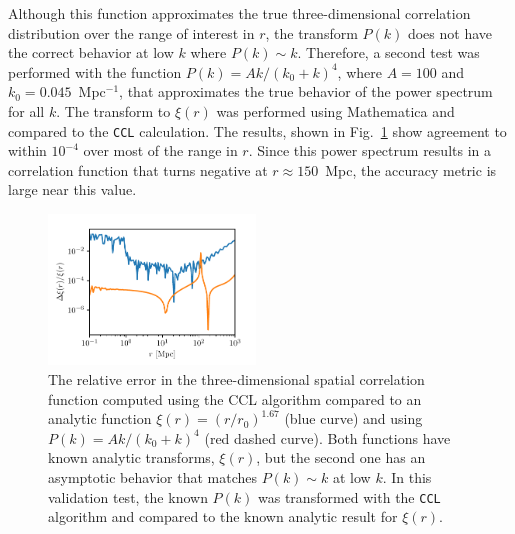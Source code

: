 \documentclass[\docopts]{\docclass}
\newcommand{\ccl}{{\tt CCL}\xspace}
\begin{document}
Although this function approximates the true three-dimensional correlation distribution over the range of interest in $r$, the transform $P(k)$ does not have the correct behavior at low $k$ where $P(k) \sim  k$. Therefore, a second test was performed with the function $P(k) = A k / (k_0 + k)^4$, where $A = 100$ and $k_0 = 0.045$~Mpc$^{-1}$, that approximates the true behavior of the power spectrum for all $k$.
The transform to $\xi(r)$ was performed using Mathematica and compared to the \ccl calculation. The results, shown in Fig.~\ref{fig:analytic_xi} show agreement to within $10^{-4}$ over most of the range in $r$. Since this power spectrum results in a correlation function that turns negative at $r \approx 150$~Mpc, the accuracy metric is large near this value. 

%
\begin{figure}[htbp]
\centering
\includegraphics[width=0.49\textwidth]{3dcorr_analytic}
\caption{The relative error in the three-dimensional spatial correlation function computed using the CCL algorithm compared to an analytic function $\xi(r) = (r/r_0)^{1.67}$ (blue curve) and using $P(k) = A k / (k_0 + k)^4$ (red dashed curve). Both functions have known analytic transforms, $\xi(r)$, but the second one has an asymptotic behavior that matches $P(k)\sim k$ at low $k$. In this validation test, the known $P(k)$ was transformed with the \ccl algorithm and compared to the known analytic result for $\xi(r)$.}
\label{fig:analytic_xi}
\end{figure}
\end{document}
